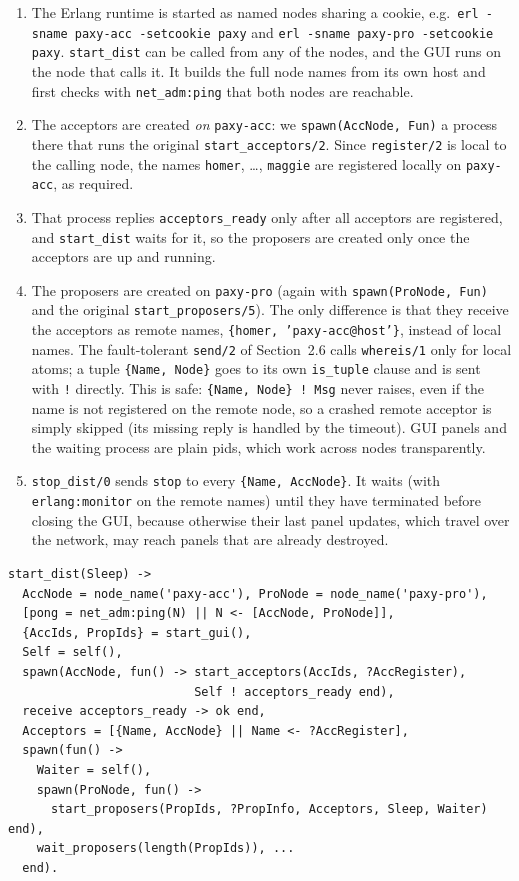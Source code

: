 \documentclass[a4paper, 10pt]{article}
\begin{document}
\begin{enumerate}
\item The Erlang runtime is started as named nodes sharing a cookie, e.g.\ \texttt{erl -sname paxy-acc -setcookie paxy} and \texttt{erl -sname paxy-pro -setcookie paxy}. \texttt{start\_dist} can be called from any of the nodes, and the GUI runs on the node that calls it. It builds the full node names from its own host and first checks with \texttt{net\_adm:ping} that both nodes are reachable.
\item The acceptors are created \emph{on} \texttt{paxy-acc}: we \texttt{spawn(AccNode, Fun)} a process there that runs the original \texttt{start\_acceptors/2}. Since \texttt{register/2} is local to the calling node, the names \texttt{homer}, \dots, \texttt{maggie} are registered locally on \texttt{paxy-acc}, as required.
\item That process replies \texttt{acceptors\_ready} only after all acceptors are registered, and \texttt{start\_dist} waits for it, so the proposers are created only once the acceptors are up and running.
\item The proposers are created on \texttt{paxy-pro} (again with \texttt{spawn(ProNode, Fun)} and the original \texttt{start\_proposers/5}). The only difference is that they receive the acceptors as remote names, \texttt{\{homer, 'paxy-acc@host'\}}, instead of local names. The fault-tolerant \texttt{send/2} of Section~2.6 calls \texttt{whereis/1} only for local atoms; a tuple \texttt{\{Name, Node\}} goes to its own \texttt{is\_tuple} clause and is sent with \texttt{!} directly. This is safe: \texttt{\{Name, Node\} ! Msg} never raises, even if the name is not registered on the remote node, so a crashed remote acceptor is simply skipped (its missing reply is handled by the timeout). GUI panels and the waiting process are plain pids, which work across nodes transparently.
\item \texttt{stop\_dist/0} sends \texttt{stop} to every \texttt{\{Name, AccNode\}}. It waits (with \texttt{erlang:monitor} on the remote names) until they have terminated before closing the GUI, because otherwise their last panel updates, which travel over the network, may reach panels that are already destroyed.
\end{enumerate}

\begin{lstlisting}
start_dist(Sleep) ->
  AccNode = node_name('paxy-acc'), ProNode = node_name('paxy-pro'),
  [pong = net_adm:ping(N) || N <- [AccNode, ProNode]],
  {AccIds, PropIds} = start_gui(),
  Self = self(),
  spawn(AccNode, fun() -> start_acceptors(AccIds, ?AccRegister),
                          Self ! acceptors_ready end),
  receive acceptors_ready -> ok end,
  Acceptors = [{Name, AccNode} || Name <- ?AccRegister],
  spawn(fun() ->
    Waiter = self(),
    spawn(ProNode, fun() ->
      start_proposers(PropIds, ?PropInfo, Acceptors, Sleep, Waiter) end),
    wait_proposers(length(PropIds)), ...
  end).
\end{lstlisting}
\end{document}
